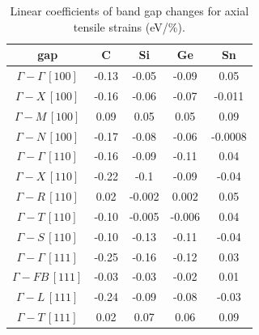 \begin{table}[!htbp]
    \centering
    \caption{Linear coefficients of band gap changes for axial tensile strains (eV/\%).}
    \begin{tabular}{|c|c|c|c|c|}
        \hline
        gap          & C & Si & Ge & Sn \\ \hline
        $\Gamma-\Gamma\,[100]$  & -0.13  & -0.05 & -0.09 & 0.05 \\ \hline
        $\Gamma-X\,[100]$  & -0.16  & -0.06  & -0.07 & -0.011 \\ \hline
        $\Gamma-M\,[100]$  & 0.09  & 0.05 & 0.05 & 0.09 \\ \hline
        $\Gamma-N\,[100]$  & -0.17  & -0.08  & -0.06 & -0.0008 \\ \hline
        $\Gamma-\Gamma\,[110]$  & -0.16 & -0.09 & -0.11 & 0.04 \\ \hline
        $\Gamma-X\,[110]$  & -0.22 & -0.1 & -0.09 & -0.04 \\ \hline
        $\Gamma-R\,[110]$  & 0.02 & -0.002 & 0.002 & 0.05 \\ \hline
        $\Gamma-T\,[110]$  & -0.10 & -0.005 & -0.006 & 0.04 \\ \hline
        $\Gamma-S\,[110]$  & -0.10 & -0.13 & -0.11 & -0.04 \\ \hline
        $\Gamma-\Gamma\,[111]$  & -0.25 & -0.16 & -0.12 & 0.03 \\ \hline
        $\Gamma-FB\,[111]$ & -0.03 & -0.03 & -0.02 & 0.01 \\ \hline
        $\Gamma-L\,[111]$  & -0.24 & -0.09 & -0.08 & -0.03 \\ \hline
        $\Gamma-T\,[111]$  & 0.02 & 0.07 & 0.06 & 0.09 \\ \hline
    \end{tabular}
    \label{Tab:strain_gap_uni_tensile}
\end{table}

